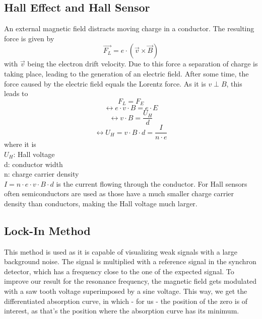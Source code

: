 \subsection{Hall Effect and Hall Sensor}
An external magnetic field distracts moving charge in a conductor. The resulting force is given by \[\vec{F_{L}}=e\cdot(\vec{v}\times \vec{B})\] with $\vec{v}$ being the electron drift velocity. Due to this force a separation of charge is taking place, leading to the generation of an electric field. After some time, the force caused by the electric field equals the Lorentz force. As it is $v\perp B$, this leads to 
\[F_{L}=F_{E}\]
\[\leftrightarrow e\cdot v\cdot B=e\cdot E\]
\[\leftrightarrow v\cdot B=\frac{U_{H}}{d}\]
\[\leftrightarrow U_{H}=v\cdot B\cdot d=\frac{I}{n\cdot e}\]
where it is\\
$U_{H}$: Hall voltage\\
d: conductor width\\
n: charge carrier density\\
$I=n\cdot e\cdot v\cdot B\cdot d$ is the current flowing through the conductor.
For Hall sensors often semiconductors are used as those have a much smaller charge carrier density than conductors, making the Hall voltage much larger.\\
\subsection{Lock-In Method}
This method is used as it is capable of visualizing weak signals with a large background noise. The signal is multiplied with a reference signal in the synchron detector, which has a frequency close to the one of the expected signal. To improve our result for the resonance frequency, the magnetic field gets modulated with a saw tooth voltage superimposed by a sine voltage. This way, we get the differentiated absorption curve, in which - for us - the position of the zero is of interest, as that's the position where the absorption curve has its minimum.
